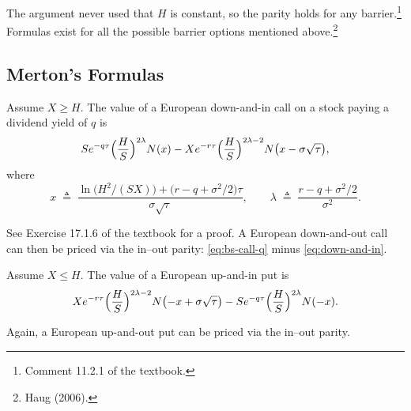 The argument never used that $H$ is constant, so the parity holds for any barrier.\footnote{Comment 11.2.1 of the textbook.}
\suppend
Formulas exist for all the possible barrier options mentioned above.\footnote{Haug (2006).}

\suppstart
{}
\suppend

\subsection{Merton's Formulas}


\begin{theorem}[Merton, 1973]
	\label{thm:down-and-in}
	Assume $X\ge H$.
	The value of a European down-and-in call on a stock paying a dividend yield of $q$ is
	\begin{equation}
		Se^{-q\tau}\Bigl(\frac{H}{S}\Bigr)^{2\lambda}N(x)-Xe^{-r\tau}\Bigl(\frac{H}{S}\Bigr)^{2\lambda-2}N\bigl(x-\sigma\sqrt{\tau}\bigr) ,
		\label{eq:down-and-in}
	\end{equation}
	where
	\[
		x \;\triangleq\; \frac{\ln\bigl(H^{2}/(SX)\bigr)+\bigl(r-q+\sigma^{2}/2\bigr)\tau}{\sigma\sqrt{\tau}} ,
		\qquad
		\lambda \;\triangleq\; \frac{r-q+\sigma^{2}/2}{\sigma^{2}} .
	\]
\end{theorem}

See Exercise 17.1.6 of the textbook for a proof.
A European down-and-out call can then be priced via the in--out parity: \eqref{eq:bs-call-q} minus \eqref{eq:down-and-in}.

\suppstart
{}
\suppend

\begin{theorem}[Merton, 1973]
	Assume $X\le H$.
	The value of a European up-and-in put is
	\[
		Xe^{-r\tau}\Bigl(\frac{H}{S}\Bigr)^{2\lambda-2}N\bigl(-x+\sigma\sqrt{\tau}\bigr)-Se^{-q\tau}\Bigl(\frac{H}{S}\Bigr)^{2\lambda}N(-x) .
	\]
\end{theorem}

Again, a European up-and-out put can be priced via the in--out parity.


